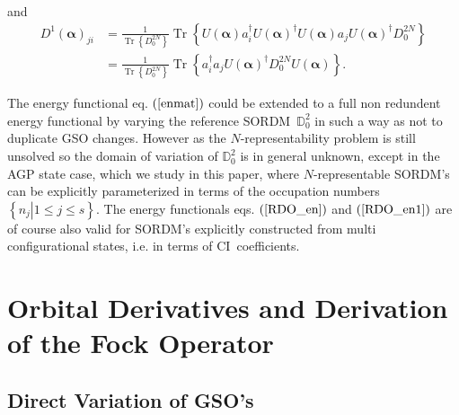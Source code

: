 \documentclass[aps,preprint]{revtex4}%
\begin{document}
and
\begin{align}
D^{1}\left(  \mathbf{\alpha}\right)  _{ji}  &  =\frac{1}{\operatorname{Tr}%
\left\{  D_{0}^{2N}\right\}  }\operatorname{Tr}\left\{  U\left(
\mathbf{\alpha}\right)  a_{i}^{\dagger}U\left(  \mathbf{\alpha}\right)
^{\dagger}U\left(  \mathbf{\alpha}\right)  a_{j}U\left(  \mathbf{\alpha
}\right)  ^{\dagger}D_{0}^{2N}\right\} \nonumber\\
&  =\frac{1}{\operatorname{Tr}\left\{  D_{0}^{2N}\right\}  }\operatorname{Tr}%
\left\{  a_{i}^{\dagger}a_{j}U\left(  \mathbf{\alpha}\right)  ^{\dagger}%
D_{0}^{2N}U\left(  \mathbf{\alpha}\right)  \right\}  .
\end{align}


The energy functional eq. $\left(  \ref{enmat}\right)  $ could be extended to
a full non redundent energy functional by varying the reference
SORDM\ $\mathbb{D}_{0}^{2}$ in such a way as not to duplicate GSO changes.
However as the $N$-representability problem is still unsolved so the domain of
variation of $\mathbb{D}_{0}^{2}$ is in general unknown, except in the AGP
state case, which we study in this paper, where $N$-representable SORDM's can
be explicitly parameterized in terms of the occupation numbers $\left\{
\left.  n_{j}\right\vert 1\leq j\leq s\right\}  $. The energy functionals eqs.
$\left(  \ref{RDO_en}\right)  $ and $\left(  \ref{RDO_en1}\right)  $ are of
course also valid for SORDM's explicitly constructed from multi
configurational states, i.e. in terms of CI\ coefficients.

\section{Orbital Derivatives and Derivation of the Fock Operator}

\subsection{Direct Variation of GSO's}
\end{document}
